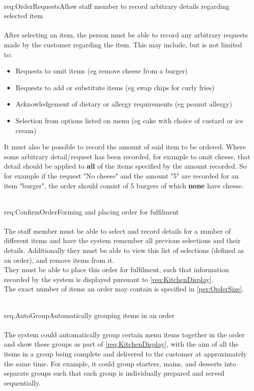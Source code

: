 \documentclass[11pt, a4paper]{report}
\def\itempar#1\\{\item \textbf{#1}\\} %
\begin{document}
\begin{enumerate}[label=F-UR-\arabic*, series=functional]
\begin{enumerate}[label*=.\arabic*]
\itempar \label{req:OrderRequests}Allow staff member to record arbitrary details regarding selected item\\
\underline{}\\
After selecting an item, the person must be able to record any arbitrary requests made by the customer regarding the item. This may include, but is not limited to: 
\begin{itemize}
\item Requests to omit items (eg remove cheese from a burger)
\item Requests to add or substitute items (eg swap chips for curly fries)
\item Acknowledgement of dietary or allergy requirements (eg peanut allergy)
\item Selection from options listed on menu (eg cake with choice of custard or ice cream)
\end{itemize}
It must also be possible to record the amount of said item to be ordered. Where some arbitrary detail/request has been recorded, for example to omit cheese, that detail should be applied to \textbf{all} of the items specified by the amount recorded. So for example if the request "No cheese" and the amount "5" are recorded for an item "burger", the order should consist of 5 burgers of which \textbf{none} have cheese.

\itempar \label{req:ConfirmOrder}Forming and placing order for fulfilment\\
\underline{}\\
The staff member must be able to select and record details for a number of different items and have the system remember all previous selections and their details. Additionally they must be able to view this list of selections (defined as an order), and remove items from it.\\
They must be able to place this order for fulfilment, such that information recorded by the system is displayed pursuant to \autoref{req:KitchenDisplay}.\\
The exact number of items an order may contain is specified in \autoref{per:OrderSize}.

\itempar \label{req:AutoGroup}Automatically grouping items in an order\\
\underline{}\\
The system could automatically group certain menu items together in the order and show these groups as part of \autoref{req:KitchenDisplay}, with the aim of all the items in a group being complete and delivered to the customer at approximately the same time. For example, it could group starters, mains, and desserts into separate groups such that each group is individually prepared and served sequentially.


\end{enumerate}
\end{enumerate}
\end{document}
